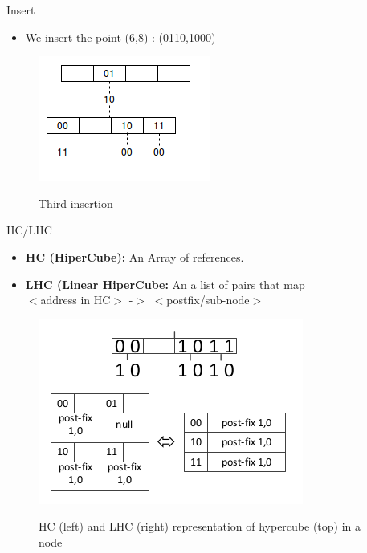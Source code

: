 \documentclass{beamer}
\begin{document}
\begin{frame}{Insert}
 \begin{itemize}
  \item We insert the point (6,8) : (0110,1000)
 \end{itemize}
 
 \begin{figure}
  \centering
  \includegraphics{7.png}
  \label{fig7}
  \caption{Third insertion}
 \end{figure}
\end{frame}

\begin{frame}{HC/LHC}
 \begin{itemize}
  \item \textbf{HC (HiperCube):} An Array of references.
  \item \textbf{LHC (Linear HiperCube:} An a list of pairs that map \\ $<$address in HC$>$ -$>$ $<$postfix/sub-node$>$
 \end{itemize}

 \begin{figure}
  \centering
  \includegraphics[scale = 0.5]{8.png}
  \label{fig8}
  \caption{HC (left) and LHC (right) representation of hypercube (top) in a node}
 \end{figure}

\end{frame}
\end{document}
